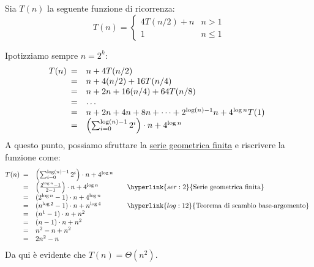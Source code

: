 \begin{eg}
    Sia $T(n)$ la seguente funzione di ricorrenza:
    \[T(n)=\begin{cases}
        4T(n/2)+n & n>1\\
        1 & n\leq1
    \end{cases}\]

    \newpage\noindent
    Ipotizziamo sempre $n=2^k$:
    \[T(n)\begin{array}[t]{cl}
        = & n + 4T(n/2)\\
        = & n + 4(n/2) + 16T(n/4)\\
        = & n + 2n + 16(n/4) + 64T(n/8)\\
        = & \dots\\
        = & n + 2n + 4n + 8n + \dots + 2^{\log(n)-1}n + 4^{\log n}T(1)\\
        = & \left(\sum_{i=0}^{\log(n)-1}2^i\right)\cdot n+4^{\log n}
    \end{array}\]
    A questo punto, possiamo sfruttare la \hyperlink{ser:2}{serie geometrica
    finita} e riscrivere la funzione come:
    \[T(n)\begin{array}[t]{cll}
        = & \left(\sum_{i=0}^{\log(n)-1}2^i\right)\cdot n+4^{\log n}\\
        = & \left(\frac{2^{\log n}-1}{2 - 1}\right)\cdot n + 4^{\log n} & \quad\hyperlink{ser:2}{\text{Serie geometrica finita}}\\
        = & (2^{\log n}-1)\cdot n+4^{\log n}\\
        = & (n^{\log 2}-1)\cdot n+n^{\log 4} & \quad\hyperlink{log:12}{\text{Teorema di scambio base-argomento}}\\
        = & (n^1-1)\cdot n+n^2\\
        = & (n-1)\cdot n+n^2\\
        = & n^2 - n + n^2\\
        = & 2n^2 - n
    \end{array}\]
    Da qui è evidente che $T(n)=\Theta(n^2)$.
\end{eg}

